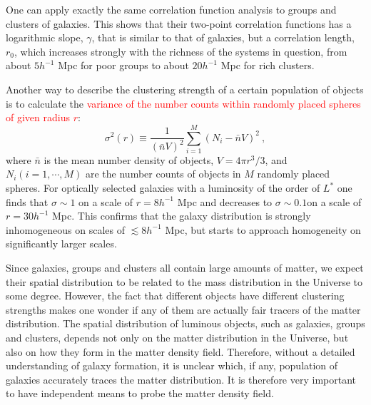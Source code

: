 \documentclass[12pt,a4paper]{article}
\begin{document}
One can apply exactly the same correlation function analysis to groups and clusters of galaxies. This shows that their two-point correlation functions has a logarithmic slope, $\gamma$, that is similar to that of galaxies, but a correlation length, $r_0$, which increases strongly with the richness of the systems in question, from about $5 h^{-1}$ Mpc for poor groups to about $20 h^{-1}$ Mpc for rich clusters. 

Another way to describe the clustering strength of a certain population of objects is to calculate the \textcolor{red}{variance of the number counts within randomly placed spheres of given radius $r$}:
\begin{equation}
\sigma^2(r) \equiv \dfrac{1}{(\bar{n} V)^2} \sum_{i=1}^M (N_i -\bar{n} V)^2 ~,
\end{equation}
where $\bar{n}$ is the mean number density of objects, $V = 4\pi r^3/3$, and $N_i (i = 1, \cdots, M)$ are the number counts of objects in $M$ randomly placed spheres. For optically selected galaxies with a luminosity of the order of $L^\ast$ one finds that $\sigma \sim 1$ on a scale of $r=8 h^{-1}$ Mpc and decreases to $\sigma \sim 0.1$on a scale of $r = 30 h^{-1}$ Mpc. This confirms that the galaxy distribution is strongly inhomogeneous on scales of $\lesssim 8 h^{-1}$ Mpc, but starts to approach homogeneity on significantly larger scales.

Since galaxies, groups and clusters all contain large amounts of matter, we expect their spatial distribution to be related to the mass distribution in the Universe to some degree. However, the fact that different objects have different clustering strengths makes one wonder if any of them are actually fair tracers of the matter distribution. The spatial distribution of luminous objects, such as galaxies, groups and clusters, depends not only on the matter distribution in the Universe, but also on how they form in the matter density field. Therefore, without a detailed understanding of galaxy formation, it is unclear which, if any, population of galaxies accurately traces the matter distribution. It is therefore very important to have independent means to probe the matter density field.
\end{document}

